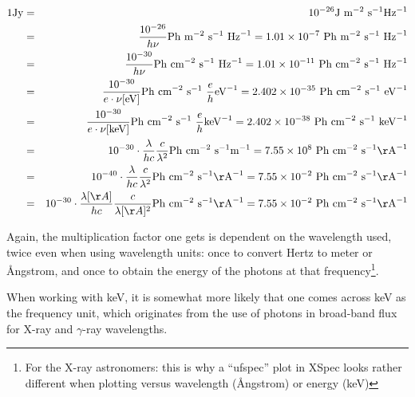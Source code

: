 \documentclass[12pt,a4paper]{article}
\newcommand{\Angstrom}{{\AA}ngstrom}
\newcommand{\jmsqshz}{\ensuremath{\mathrm{J}\ \mathrm{m}^{-2}\ \mathrm{s^{-1}} \mathrm{Hz^{-1}}}}
\begin{document}
\begin{eqnarray*}
1 \mathrm{Jy} & = & 10^{-26} \jmsqshz \\
& = & \frac{10^{-26}}{h \nu} \mathrm{Ph}\ \mathrm{m}^{-2} \ \mathrm{s}^{-1} \ \mathrm{Hz}^{-1} = 1.01 \times 10^{-7}\ \mathrm{Ph}\ \mathrm{m}^{-2} \ \mathrm{s}^{-1} \ \mathrm{Hz}^{-1} \\
& = & \frac{10^{-30}}{h \nu} \mathrm{Ph\ cm}^{-2}\ \mathrm{s}^{-1} \ \mathrm{Hz}^{-1} = 1.01 \times 10^{-11}\ \mathrm{Ph\ cm}^{-2}\ \mathrm{s}^{-1} \ \mathrm{Hz}^{-1} \\
& = & \frac{10^{-30}}{e \cdot \nu[\mathrm{eV}]} \mathrm{Ph\ cm}^{-2} \ \mathrm{s}^{-1}\ \frac{e}{h} \mathrm{eV}^{-1} = 2.402 \times 10^{-35}\  \mathrm{Ph\ cm}^{-2} \ \mathrm{s}^{-1}\ \mathrm{eV}^{-1} \\
& = & \frac{10^{-30}}{e \cdot \nu[\mathrm{keV}]} \mathrm{Ph\ cm}^{-2} \ \mathrm{s}^{-1}\ \frac{e}{h} \mathrm{keV}^{-1} = 2.402 \times 10^{-38}\  \mathrm{Ph\ cm}^{-2} \ \mathrm{s}^{-1}\ \mathrm{keV}^{-1}\\
& = & 10^{-30} \cdot \frac{\lambda}{h c}  \frac{c}{\lambda^{2}} \mathrm{Ph}\ \mathrm{cm}^{-2}\ \mathrm{s}^{-1} \mathrm{m}^{-1} = 7.55 \times 10^8\ \mathrm{Ph}\ \mathrm{cm}^{-2}\ \mathrm{s}^{-1} \mathrm{\AA}^{-1} \\
& = & 10^{-40} \cdot \frac{\lambda}{h c}  \frac{c}{\lambda^{2}} \mathrm{Ph}\ \mathrm{cm}^{-2}\ \mathrm{s}^{-1} \mathrm{\AA}^{-1} = 7.55 \times 10^{-2}\ \mathrm{Ph}\ \mathrm{cm}^{-2}\ \mathrm{s}^{-1} \mathrm{\AA}^{-1} \\
& = & 10^{-30} \cdot \frac{\lambda[\AA]}{h c}  \frac{c}{\lambda[\AA]^{2}} \mathrm{Ph}\ \mathrm{cm}^{-2}\ \mathrm{s}^{-1} \mathrm{\AA}^{-1} = 7.55 \times 10^{-2}\ \mathrm{Ph}\ \mathrm{cm}^{-2}\ \mathrm{s}^{-1} \mathrm{\AA}^{-1} \\
\end{eqnarray*}

Again, the multiplication factor one gets is dependent on the wavelength used, twice even when using wavelength units: once to convert Hertz to meter or \Angstrom, and once to obtain the energy of the photons at that frequency\footnote{For the X-ray astronomers: this is why a ``ufspec'' plot in XSpec looks rather different when plotting versus wavelength (\Angstrom) or energy (keV)}.

When working with keV, it is somewhat more likely that one comes across keV as the frequency unit, which originates from the use of photons in broad-band flux for X-ray and $\gamma$-ray wavelengths. 
\end{document}
